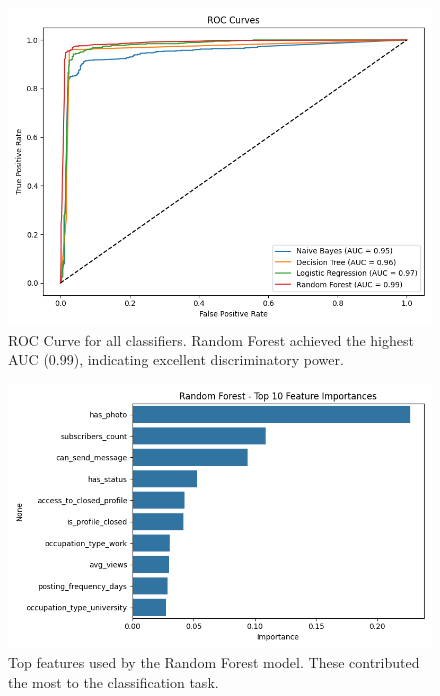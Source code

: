 \documentclass[conference]{IEEEtran}
\begin{document}
\begin{figure}[htbp]
\centerline{\includegraphics[width=\linewidth]{ROC_Curve.png}}
\caption{ROC Curve for all classifiers. Random Forest achieved the highest AUC (0.99), indicating excellent discriminatory power.}
\label{fig:roc_curve}
\end{figure}

\begin{figure}[htbp]
\centerline{\includegraphics[width=\linewidth]{Random_Forest_Top_Features.png}}
\caption{Top features used by the Random Forest model. These contributed the most to the classification task.}
\label{fig:rf_features}
\end{figure}
\end{document}
